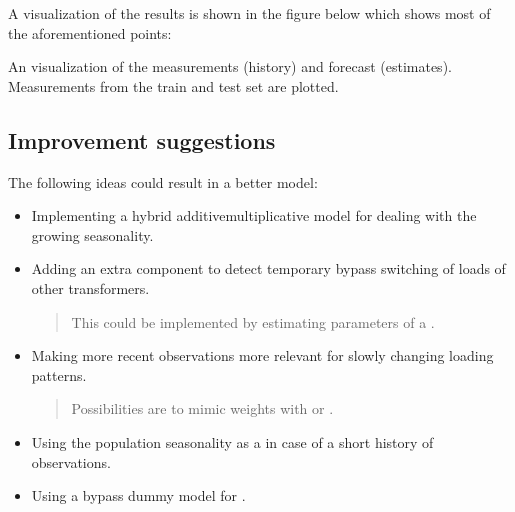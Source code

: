 \documentclass[letterpaper,10pt,english]{sphinxmanual}
\let\sphinxpxdimen\pdfpxdimen\else\newdimen\sphinxpxdimen
\begin{document}
A visualization of the results is shown in the figure below which shows most of the aforementioned points:
\begin{quote}

\noindent{\hspace*{\fill}\sphinxincludegraphics[width=800\sphinxpxdimen]{{additive_model}.png}\hspace*{\fill}}
\end{quote}

An visualization of the measurements (history) and forecast (estimates).
Measurements from the train and test set are plotted.


\subsection{Improvement suggestions}
\label{\detokenize{modeling:improvement-suggestions}}
The following ideas could result in a better model:
\begin{itemize}
\item {} 
Implementing a hybrid additive\sphinxhyphen{}multiplicative model for dealing with the growing seasonality.

\item {} 
Adding an extra component to detect temporary bypass switching of loads of other transformers.
\begin{quote}

This could be implemented by estimating parameters of a .
\end{quote}

\item {} 
Making more recent observations more relevant for slowly changing loading patterns.
\begin{quote}

Possibilities are to mimic weights with  or .
\end{quote}

\item {} 
Using the population seasonality as a  in case of a short history of observations.

\item {} 
Using a by\sphinxhyphen{}pass dummy model for .

\end{itemize}
\end{document}
